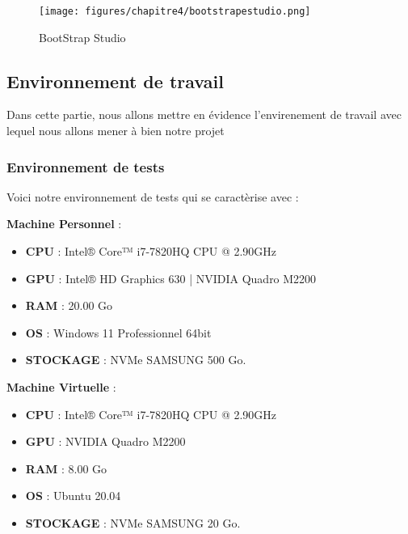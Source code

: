         \begin{figure}[H]
        	\begin{center}
        		\texttt{[image: figures/chapitre4/bootstrapestudio.png]}
        	\end{center}
        	\caption {BootStrap Studio}
        	\label{fig:bootstrpstudio}
        \end{figure} 
    
    \subsection{Environnement de travail} 
    \par Dans cette partie, nous allons mettre en évidence l'envirenement de travail avec lequel nous allons mener à bien notre projet
    
        \subsubsection{Environnement de tests}
        \par Voici notre environnement de tests qui se caractèrise avec :
        
        \textbf{Machine Personnel} :
        \begin{itemize}[label=•] 
        \setlength{\itemsep}{5pt}
            \item  \textbf{CPU} : Intel® Core™ i7-7820HQ CPU @ 2.90GHz
            \item  \textbf{GPU} : Intel® HD Graphics 630 | NVIDIA Quadro M2200 
            \item  \textbf{RAM} : 20.00 Go
            \item  \textbf{OS} : Windows 11 Professionnel 64bit
            \item  \textbf{STOCKAGE} : NVMe SAMSUNG 500 Go.
        \end{itemize}
        
        \textbf{Machine Virtuelle} :
        \begin{itemize}[label=•] 
        \setlength{\itemsep}{5pt}
            \item  \textbf{CPU} : Intel® Core™ i7-7820HQ CPU @ 2.90GHz
            \item  \textbf{GPU} : NVIDIA Quadro M2200 
            \item  \textbf{RAM} : 8.00 Go
            \item  \textbf{OS} : Ubuntu 20.04
            \item  \textbf{STOCKAGE} : NVMe SAMSUNG 20 Go.
        \end{itemize}
        
